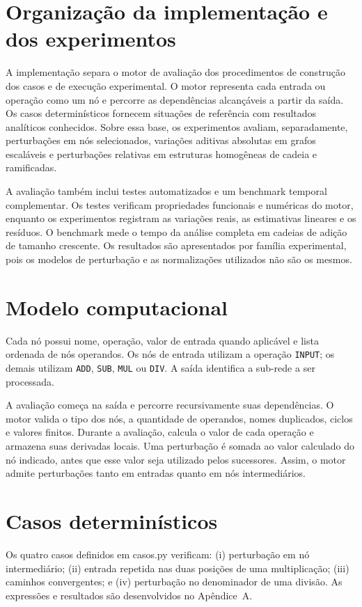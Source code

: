 \documentclass[12pt,openright,oneside,a4paper,brazil]{abntex2}
\newcommand{\arquivo}[1]{\textsf{\small #1}}
\begin{document}
\section{Organização da implementação e dos experimentos}
A implementação separa o motor de avaliação dos procedimentos de construção dos casos e de execução experimental. O motor representa cada entrada ou operação como um nó e percorre as dependências alcançáveis a partir da saída. Os casos determinísticos fornecem situações de referência com resultados analíticos conhecidos. Sobre essa base, os experimentos avaliam, separadamente, perturbações em nós selecionados, variações aditivas absolutas em grafos escaláveis e perturbações relativas em estruturas homogêneas de cadeia e ramificadas.

A avaliação também inclui testes automatizados e um benchmark temporal complementar. Os testes verificam propriedades funcionais e numéricas do motor, enquanto os experimentos registram as variações reais, as estimativas lineares e os resíduos. O benchmark mede o tempo da análise completa em cadeias de adição de tamanho crescente. Os resultados são apresentados por família experimental, pois os modelos de perturbação e as normalizações utilizados não são os mesmos.

\section{Modelo computacional}
Cada nó possui nome, operação, valor de entrada quando aplicável e lista ordenada de nós operandos. Os nós de entrada utilizam a operação \texttt{INPUT}; os demais utilizam \texttt{ADD}, \texttt{SUB}, \texttt{MUL} ou \texttt{DIV}. A saída identifica a sub-rede a ser processada.

A avaliação começa na saída e percorre recursivamente suas dependências. O motor valida o tipo dos nós, a quantidade de operandos, nomes duplicados, ciclos e valores finitos. Durante a avaliação, calcula o valor de cada operação e armazena suas derivadas locais. Uma perturbação é somada ao valor calculado do nó indicado, antes que esse valor seja utilizado pelos sucessores. Assim, o motor admite perturbações tanto em entradas quanto em nós intermediários.

\section{Casos determinísticos}
Os quatro casos definidos em \arquivo{casos.py} verificam: (i) perturbação em nó intermediário; (ii) entrada repetida nas duas posições de uma multiplicação; (iii) caminhos convergentes; e (iv) perturbação no denominador de uma divisão. As expressões e resultados são desenvolvidos no Apêndice~A.
\end{document}
